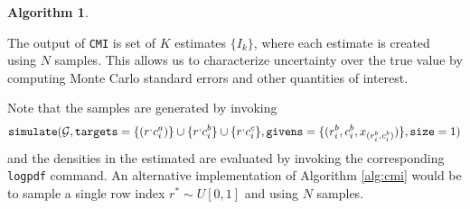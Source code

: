 \documentclass[10pt,letterpaper]{article}
\newtheorem{algorithm}{Algorithm}[section]
\newcommand{\set}[1]{\{#1\}}
\begin{document}
\begin{enumerate}
\begin{algorithm}
    \end{algorithm}
    
    The output of \texttt{CMI} is set of $K$ estimates $\set{I_k}$, where each estimate is created using $N$ samples. This allows us to characterize uncertainty over the true value by computing Monte Carlo standard errors and other quantities of interest.

    Note that the samples are generated by invoking
    \begin{align*}
    {\tt simulate(} \mathcal{G},
    {\tt targets} = \set{(r^,c_i^a)}\cup\set{r^,c_i^b}\cup\set{r^,c_i^c},
    {\tt givens} = \set{(r_i^b,c_i^b,x_{(r_i^b,c_i^b)})},
    {\tt size} = 1)
    \end{align*}
    and the densities in the estimated are evaluated by invoking the corresponding \texttt{logpdf} command. An alternative implementation of Algorithm \ref{alg:cmi} would be to sample a single row index $r^* \sim U[0,1]$ and using $N$ samples.
\end{enumerate}
\end{document}
